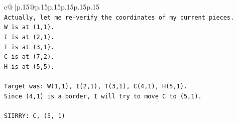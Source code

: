 \documentclass{article}
\begin{document}
{\begin{supertabular}{c@{$\;$}|p{.15\linewidth}@{}p{.15\linewidth}p{.15\linewidth}p{.15\linewidth}p{.15\linewidth}p{.15\linewidth}}
{{{\\ 
\texttt{Actually, let me re{-}verify the coordinates of my current pieces.} \\
\texttt{W is at (1,1).} \\
\texttt{I is at (2,1).} \\
\texttt{T is at (3,1).} \\
\texttt{C is at (7,2).} \\
\texttt{H is at (5,5).} \\
\\ 
\texttt{Target was: W(1,1), I(2,1), T(3,1), C(4,1), H(5,1).} \\
\texttt{Since (4,1) is a border, I will try to move C to (5,1).} \\
\\ 
\texttt{SIIRRY: C, (5, 1)} \\
            }
        }
    }
     \\ \\


\end{supertabular}}
\end{document}
